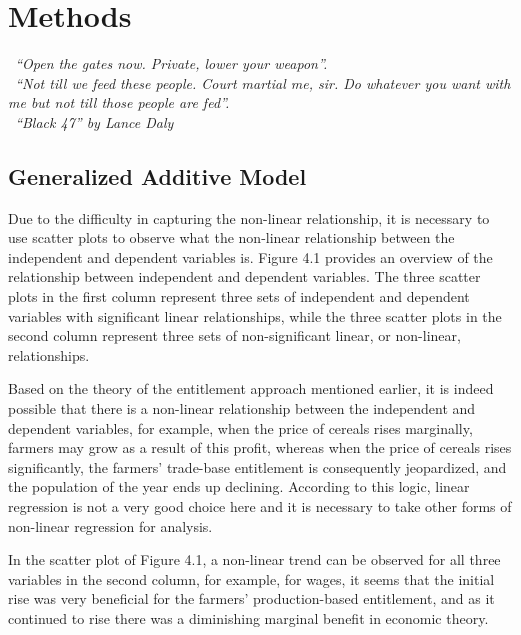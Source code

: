 \chapter{Methods}


\textit{\textendash\ ``Open the gates now. Private, lower your weapon''. \\ 
\textendash\ ``Not till we feed these people. Court martial me, sir. Do whatever you want with me but not till those people are fed''.\\
\textemdash\ ``Black 47'' by Lance Daly}	

\vspace{.2cm}

\section{Generalized Additive Model}

Due to the difficulty in capturing the non-linear relationship, it is necessary to use scatter plots to observe what the non-linear relationship between the independent and dependent variables is. Figure 4.1 provides an overview of the relationship between independent and dependent variables. The three scatter plots in the first column represent three sets of independent and dependent variables with significant linear relationships, while the three scatter plots in the second column represent three sets of non-significant linear, or non-linear, relationships.

Based on the theory of the entitlement approach mentioned earlier, it is indeed possible that there is a non-linear relationship between the independent and dependent variables, for example, when the price of cereals rises marginally, farmers may grow as a result of this profit, whereas when the price of cereals rises significantly, the farmers' trade-base entitlement is consequently jeopardized, and the population of the year ends up declining. According to this logic, linear regression is not a very good choice here and it is necessary to take other forms of non-linear regression for analysis. 

In the scatter plot of Figure 4.1, a non-linear trend can be observed for all three variables in the second column, for example, for wages, it seems that the initial rise was very beneficial for the farmers' production-based entitlement, and as it continued to rise there was a diminishing marginal benefit in economic theory.

